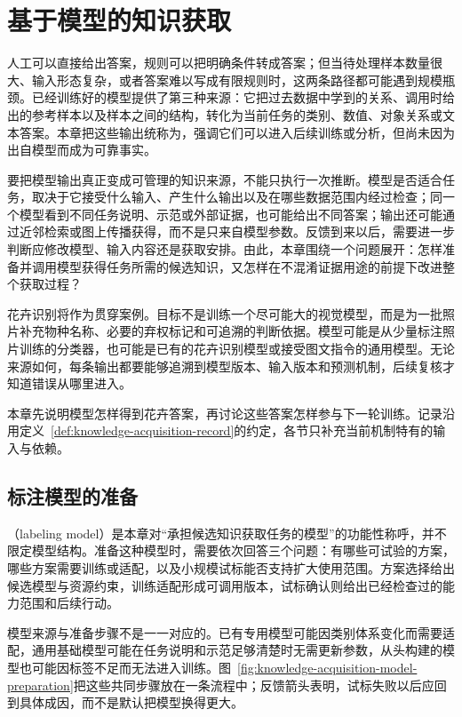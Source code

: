 \chapter{基于模型的知识获取}
\label{chap:knowledge-acquisition-model-based}

人工可以直接给出答案，规则可以把明确条件转成答案；但当待处理样本数量很大、输入形态复杂，或者答案难以写成有限规则时，这两条路径都可能遇到规模瓶颈。已经训练好的模型提供了第三种来源：它把过去数据中学到的关系、调用时给出的参考样本以及样本之间的结构，转化为当前任务的类别、数值、对象关系或文本答案。本章把这些输出统称为，强调它们可以进入后续训练或分析，但尚未因为出自模型而成为可靠事实。

要把模型输出真正变成可管理的知识来源，不能只执行一次推断。模型是否适合任务，取决于它接受什么输入、产生什么输出以及在哪些数据范围内经过检查；同一个模型看到不同任务说明、示范或外部证据，也可能给出不同答案；输出还可能通过近邻检索或图上传播获得，而不是只来自模型参数。反馈到来以后，需要进一步判断应修改模型、输入内容还是获取安排。由此，本章围绕一个问题展开：怎样准备并调用模型获得任务所需的候选知识，又怎样在不混淆证据用途的前提下改进整个获取过程？

花卉识别将作为贯穿案例。目标不是训练一个尽可能大的视觉模型，而是为一批照片补充物种名称、必要的弃权标记和可追溯的判断依据。模型可能是从少量标注照片训练的分类器，也可能是已有的花卉识别模型或接受图文指令的通用模型。无论来源如何，每条输出都要能够追溯到模型版本、输入版本和预测机制，后续复核才知道错误从哪里进入。

本章先说明模型怎样得到花卉答案，再讨论这些答案怎样参与下一轮训练。记录沿用定义~\ref{def:knowledge-acquisition-record}的约定，各节只补充当前机制特有的输入与依赖。

\section{标注模型的准备}
\label{sec:knowledge-acquisition-model-preparation}

（labeling model）是本章对“承担候选知识获取任务的模型”的功能性称呼，并不限定模型结构。准备这种模型时，需要依次回答三个问题：有哪些可试验的方案，哪些方案需要训练或适配，以及小规模试标能否支持扩大使用范围。方案选择给出候选模型与资源约束，训练适配形成可调用版本，试标确认则给出已经检查过的能力范围和后续行动。

模型来源与准备步骤不是一一对应的。已有专用模型可能因类别体系变化而需要适配，通用基础模型可能在任务说明和示范足够清楚时无需更新参数，从头构建的模型也可能因标签不足而无法进入训练。图~\ref{fig:knowledge-acquisition-model-preparation}把这些共同步骤放在一条流程中；反馈箭头表明，试标失败以后应回到具体成因，而不是默认把模型换得更大。

